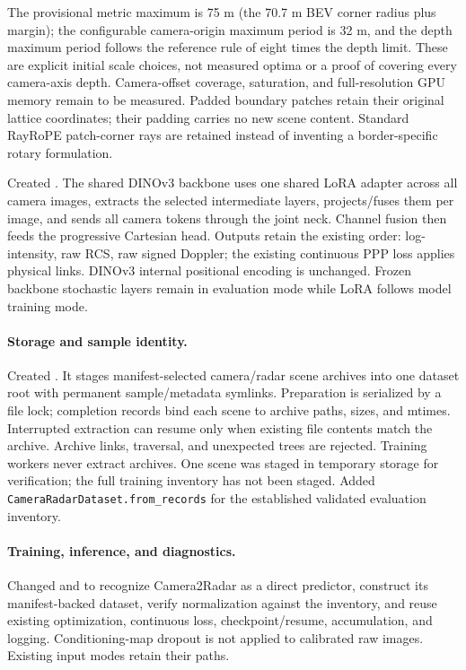 \documentclass[11pt,a4paper]{article}
\begin{document}
The provisional metric maximum is 75 m (the 70.7 m BEV corner radius plus margin); the configurable camera-origin maximum period is 32 m, and the depth maximum period follows the reference rule of eight times the depth limit. These are explicit initial scale choices, not measured optima or a proof of covering every camera-axis depth. Camera-offset coverage, saturation, and full-resolution GPU memory remain to be measured. Padded boundary patches retain their original lattice coordinates; their padding carries no new scene content. Standard RayRoPE patch-corner rays are retained instead of inventing a border-specific rotary formulation.

Created . The shared DINOv3 backbone uses one shared LoRA adapter across all camera images, extracts the selected intermediate layers, projects/fuses them per image, and sends all camera tokens through the joint neck. Channel fusion then feeds the progressive Cartesian head. Outputs retain the existing order: log-intensity, raw RCS, raw signed Doppler; the existing continuous PPP loss applies physical links. DINOv3 internal positional encoding is unchanged. Frozen backbone stochastic layers remain in evaluation mode while LoRA follows model training mode.

\paragraph{Storage and sample identity.}
Created . It stages manifest-selected camera/radar scene archives into one dataset root with permanent sample/metadata symlinks. Preparation is serialized by a file lock; completion records bind each scene to archive paths, sizes, and mtimes. Interrupted extraction can resume only when existing file contents match the archive. Archive links, traversal, and unexpected trees are rejected. Training workers never extract archives. One scene was staged in temporary storage for verification; the full training inventory has not been staged. Added \texttt{CameraRadarDataset.from\_records} for the established validated evaluation inventory.

\paragraph{Training, inference, and diagnostics.}
Changed  and  to recognize Camera2Radar as a direct predictor, construct its manifest-backed dataset, verify normalization against the inventory, and reuse existing optimization, continuous loss, checkpoint/resume, accumulation, and logging. Conditioning-map dropout is not applied to calibrated raw images. Existing input modes retain their paths.
\end{document}
